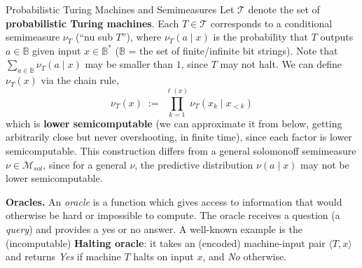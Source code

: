 \documentclass[aspectratio=169,10pt]{beamer}
\newcommand{\B}{\mathbb{B}}
\newcommand{\Mc}{\mathcal{M}}
\newcommand{\Tc}{\mathcal{T}}
\begin{document}
\begin{frame}{Probabilistic Turing Machines and Semimeasures}
  Let $\Tc$ denote the set of \textbf{probabilistic Turing machines}. Each
  $T\in\Tc$ corresponds to a conditional semimeasure $\nu_T$ (``nu sub
  $T$''), where $\nu_T(a\mid x)$ is the probability that $T$ outputs
  $a\in\B$ given input $x\in\B^*$ ($\B$ = the set of finite/infinite bit
  strings). Note that $\sum_{a\in\B}\nu_T(a\mid x)$ may be smaller than
  $1$, since $T$ may not halt. We can define $\nu_T(x)$ via the chain
  rule,
  \[
    \nu_T(x) \;:=\; \prod_{k=1}^{\ell(x)} \nu_T(x_k\mid x_{<k})
  \]
  which is \textbf{lower semicomputable} (we can approximate it from
  below, getting arbitrarily close but never overshooting, in finite
  time), since each factor is lower semicomputable. This construction
  differs from a general solomonoff semimeasure $\nu\in\Mc_{sol}$, since
  for a general $\nu$, the predictive distribution $\nu(a\mid x)$ may not
  be lower semicomputable.

  \vspace{0.3em}
  \textbf{Oracles.} An \emph{oracle} is a function which gives access to
  information that would otherwise be hard or impossible to compute. The
  oracle receives a question (a \emph{query}) and provides a yes or no
  answer. A well-known example is the (incomputable) \textbf{Halting
  oracle}: it takes an (encoded) machine-input pair $\langle T,x\rangle$
  and returns \emph{Yes} if machine $T$ halts on input $x$, and \emph{No}
  otherwise.
\end{frame}
\end{document}
